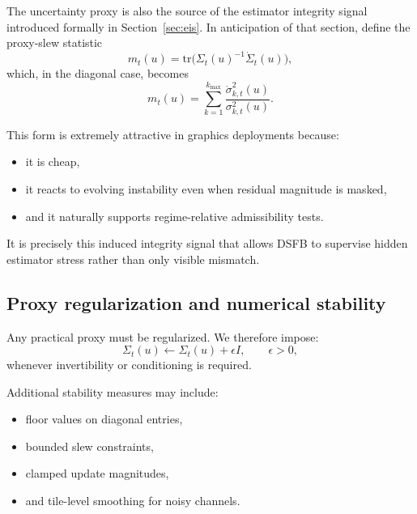\documentclass[11pt]{article}
\theoremstyle{definition}
\theoremstyle{plain}
\begin{document}
The uncertainty proxy is also the source of the estimator integrity signal introduced formally in Section~\ref{sec:eis}. In anticipation of that section, define the proxy-slew statistic
\begin{equation}
m_t(u)=\mathrm{tr}\!\bigl(\Sigma_t(u)^{-1}\dot{\Sigma}_t(u)\bigr),
\end{equation}
which, in the diagonal case, becomes
\begin{equation}
m_t(u)=\sum_{k=1}^{k_{\max}} \frac{\dot{\sigma}^{2}_{k,t}(u)}{\sigma^{2}_{k,t}(u)}.
\end{equation}

This form is extremely attractive in graphics deployments because:
\begin{itemize}[leftmargin=1.5em]
    \item it is cheap,
    \item it reacts to evolving instability even when residual magnitude is masked,
    \item and it naturally supports regime-relative admissibility tests.
\end{itemize}

It is precisely this induced integrity signal that allows DSFB to supervise hidden estimator stress rather than only visible mismatch.


\subsection{Proxy regularization and numerical stability}

Any practical proxy must be regularized. We therefore impose:
\begin{equation}
\Sigma_t(u)\leftarrow \Sigma_t(u)+\epsilon I,
\qquad \epsilon>0,
\end{equation}
whenever invertibility or conditioning is required.

Additional stability measures may include:
\begin{itemize}[leftmargin=1.5em]
    \item floor values on diagonal entries,
    \item bounded slew constraints,
    \item clamped update magnitudes,
    \item and tile-level smoothing for noisy channels.
\end{itemize}
\end{document}
